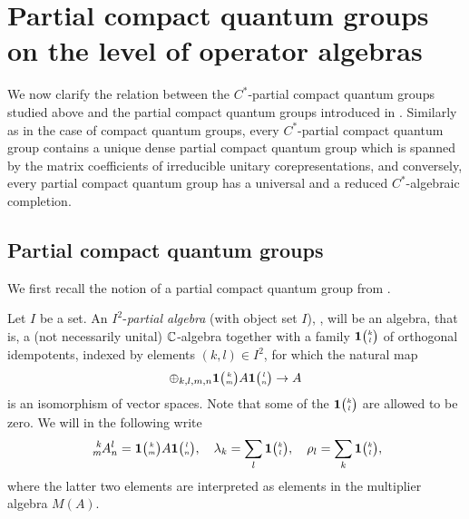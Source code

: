 \section{Partial compact quantum groups on the level of operator algebras}


We now clarify the relation between the $C^{*}$-partial compact quantum groups studied above and the partial compact quantum groups introduced in \cite{DCT1}. Similarly as in the case of compact quantum groups, every $C^{*}$-partial compact quantum group contains a unique dense partial compact quantum group which is spanned  by the matrix coefficients   of irreducible unitary corepresentations, and conversely, every partial compact quantum group has a universal and a reduced $C^{*}$-algebraic completion.

\subsection{Partial compact quantum groups}

We first recall the notion of a partial compact quantum group  from \cite{DCT1}. 

Let $I$ be a set. An $I^2$-\emph{partial algebra} (with object set $I$), \cite[Definition 1.1]{DCT1}, will be an algebra, that is, a (not necessarily unital) $\mathbb{C}$-algebra together with a family $\mathbf{1}{\tiny {\begin{pmatrix} k\\l\end{pmatrix}}}$ of orthogonal idempotents, indexed by elements $(k,l)\in I^2$, for which the natural map \[\oplus_{k,l,m,n} \mathbf{1}{\tiny {\begin{pmatrix} k\\m\end{pmatrix}}}A\mathbf{1}{\tiny {\begin{pmatrix} l\\n\end{pmatrix}}} \rightarrow A\] is an isomorphism of vector spaces. Note that some of the $\mathbf{1}{\tiny {\begin{pmatrix} k\\l\end{pmatrix}}}$ are allowed to be zero. We will in the following write \[\Gr{A}{k}{l}{m}{n} = \UnitC{k}{m}A\UnitC{l}{n}, \quad \lambda_k = \sum_l \UnitC{k}{l},\quad \rho_l = \sum_k \UnitC{k}{l},\]  where the latter two elements are interpreted as elements in the multiplier algebra $M(A)$. 

